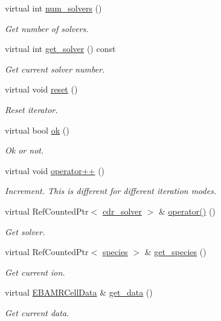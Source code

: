 \begin{DoxyCompactItemize}
virtual int \hyperlink{classcdr__iterator_a854baf350221e172c6a5c4e864ad0999}{num\+\_\+solvers} ()
\begin{DoxyCompactList}\small\item\em Get number of solvers. \end{DoxyCompactList}\item 
virtual int \hyperlink{classcdr__iterator_ad00bb88770e019ce57060a4d41665532}{get\+\_\+solver} () const 
\begin{DoxyCompactList}\small\item\em Get current solver number. \end{DoxyCompactList}\item 
virtual void \hyperlink{classcdr__iterator_ad2705a630466bb5568e32c8a27d87b03}{reset} ()
\begin{DoxyCompactList}\small\item\em Reset iterator. \end{DoxyCompactList}\item 
virtual bool \hyperlink{classcdr__iterator_a5b1bc18ecfea1890e5dbde8aa853a2a8}{ok} ()
\begin{DoxyCompactList}\small\item\em Ok or not. \end{DoxyCompactList}\item 
virtual void \hyperlink{classcdr__iterator_a8fc4a4a93108199d7fd8961a43c5d38a}{operator++} ()
\begin{DoxyCompactList}\small\item\em Increment. This is different for different iteration modes. \end{DoxyCompactList}\item 
virtual Ref\+Counted\+Ptr$<$ \hyperlink{classcdr__solver}{cdr\+\_\+solver} $>$ \& \hyperlink{classcdr__iterator_aa1bb336f85c94268f9ff34232080673f}{operator()} ()
\begin{DoxyCompactList}\small\item\em Get solver. \end{DoxyCompactList}\item 
virtual Ref\+Counted\+Ptr$<$ \hyperlink{classspecies}{species} $>$ \& \hyperlink{classcdr__iterator_a78eeb3ccb633b7c619f8af60b10557c6}{get\+\_\+species} ()
\begin{DoxyCompactList}\small\item\em Get current ion. \end{DoxyCompactList}\item 
virtual \hyperlink{type__definitions_8H_a7e610f301989e5e07781c5e338bdb7c3}{E\+B\+A\+M\+R\+Cell\+Data} \& \hyperlink{classcdr__iterator_a47fbe5b9df76aad8aff5c918aa708d7e}{get\+\_\+data} ()
\begin{DoxyCompactList}\small\item\em Get current data. \end{DoxyCompactList}\end{DoxyCompactItemize}
